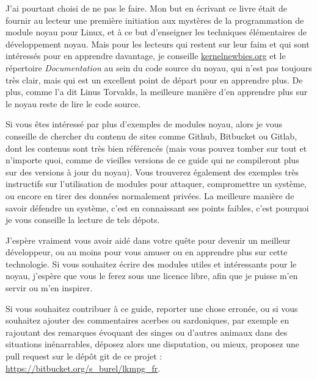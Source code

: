\documentclass[11pt]{article}
\begin{document}
J'ai pourtant choisi de ne pas le faire. Mon but en écrivant ce livre était de fournir au lecteur une première initiation aux mystères de la programmation de module noyau pour Linux, et à ce but d'enseigner les techniques élémentaires de développement noyau. Mais pour les lecteurs qui restent sur leur faim et qui sont intéressés pour en apprendre davantage, je conseille \href{https://kernelnewbies.org}{kernelnewbies.org} et le répertoire \emph{Documentation} au sein du code source du noyau, qui n'est pas toujours très clair, mais qui est un excellent point de départ pour en apprendre plus. De plus, comme l'a dit Linus Torvalds, la meilleure manière d'en apprendre plus sur le noyau reste de lire le code source.

Si vous êtes intéressé par plus d'exemples de modules noyau, alors je vous conseille de chercher du contenu de sites comme Github, Bitbucket ou Gitlab, dont les contenus sont très bien référencés (mais vous pouvez tomber sur tout et n'importe quoi, comme de vieilles versions de ce guide qui ne compileront plus sur des versions à jour du noyau). Vous trouverez également des exemples très instructifs sur l'utilisation de modules pour attaquer, compromettre un système, ou encore en tirer des données normalement privées. La meilleure manière de savoir défendre un système, c'est en connaissant ses points faibles, c'est pourquoi je vous conseille la lecture de tels dépots.

J'espère vraiment vous avoir aidé dans votre quête pour devenir un meilleur développeur, ou au moins pour vous amuser ou en apprendre plus sur cette technologie. Si vous souhaitez écrire des modules utiles et intéressants pour le noyau, j'espère que vous le ferez sous une licence libre, afin que je puisse m'en servir ou m'en inspirer.

Si vous souhaitez contribuer à ce guide, reporter une chose erronée, ou si vous souhaitez ajouter des commentaires acerbes ou sardoniques, par exemple en rajoutant des remarques évoquant des singes ou d'autres animaux dans des situations inénarrables, déposez alors une disputation, ou mieux, proposez une pull request sur le dépôt git de ce projet : \url{https://bitbucket.org/s_burel/lkmpg_fr}.
\end{document}
